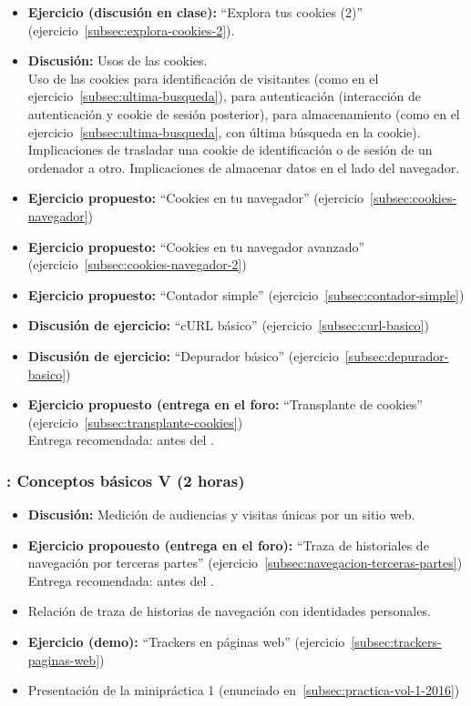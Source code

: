 \documentclass[a4paper,12pt]{article}
\begin{document}
\begin{itemize}
\item \textbf{Ejercicio (discusión en clase):} ``Explora tus cookies (2)'' (ejercicio~\ref{subsec:explora-cookies-2}).
\item \textbf{Discusión:} Usos de las cookies. \\
  Uso de las cookies para identificación de visitantes (como en el ejercicio~\ref{subsec:ultima-busqueda}), para autenticación (interacción de autenticación y cookie de sesión posterior), para almacenamiento (como en el ejercicio~\ref{subsec:ultima-busqueda}, con última búsqueda en la cookie). Implicaciones de trasladar una cookie de identificación o de sesión de un ordenador a otro. Implicaciones de almacenar datos en el lado del navegador.
\item \textbf{Ejercicio propuesto:} ``Cookies en tu navegador'' (ejercicio~\ref{subsec:cookies-navegador}) \\
\item \textbf{Ejercicio propuesto:} ``Cookies en tu navegador avanzado'' (ejercicio~\ref{subsec:cookies-navegador-2}) \\
\item \textbf{Ejercicio propuesto:} ``Contador simple'' (ejercicio~\ref{subsec:contador-simple})
\item \textbf{Discusión de ejercicio:} ``cURL básico'' (ejercicio~\ref{subsec:curl-basico})
\item \textbf{Discusión de ejercicio:} ``Depurador básico'' (ejercicio~\ref{subsec:depurador-basico})
\item \textbf{Ejercicio propuesto (entrega en el foro:} ``Transplante de cookies'' (ejercicio~\ref{subsec:transplante-cookies}) \\
  Entrega recomendada: antes del \juevesF.
\end{itemize}

\subsubsection{\juevesF: Conceptos básicos V (2 horas)}
\label{cal:juevesF}

\begin{itemize}
\item \textbf{Discusión:} Medición de audiencias y visitas únicas por un sitio web.
\item \textbf{Ejercicio propouesto (entrega en el foro):} ``Traza de historiales de navegación por terceras partes'' (ejercicio~\ref{subsec:navegacion-terceras-partes}) \\
  Entrega recomendada: antes del \juevesG.
\item Relación de traza de historias de navegación con identidades personales.
\item \textbf{Ejercicio (demo):} ``Trackers en páginas web'' (ejercicio~\ref{subsec:trackers-paginas-web}) 
\item Presentación de la minipráctica 1 (enunciado en~\ref{subsec:practica-vol-1-2016})
\end{itemize}
\end{document}

